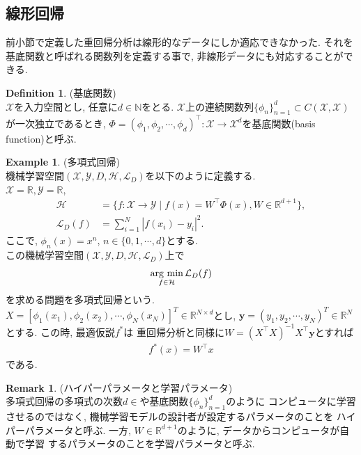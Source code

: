 \documentclass[11pt, a4paper, dvipdfmx]{jsarticle}
\theoremstyle{definition}
\newtheorem{Definition+}[Axiom+]{Definition}
\newtheorem{Example+}[Axiom+]{Example}
\newtheorem{Remark+}[Axiom+]{Remark}
\newcommand{\N}{\mathbb{N}}
\newcommand{\R}{\mathbb{R}}
\newcommand{\X}{\mathcal{X}}
\newcommand{\Y}{\mathcal{Y}}
\newcommand{\Hil}{\mathcal{H}}
\newcommand{\Loss}{\mathcal{L}_{D}}
\newcommand{\MLsp}{(\X, \Y, D, \Hil, \Loss)}
\newcommand{\argmin}{\mathop{\rm arg~min}\limits}
\begin{document}
\subsection{線形回帰}
前小節で定義した重回帰分析は線形的なデータにしか適応できなかった. それを
基底関数と呼ばれる関数列を定義する事で, 非線形データにも対応することができる.
\begin{Definition+}(基底関数)\\
    $\X$を入力空間とし, 任意に$d\in\N$をとる. $\X$上の連続関数列$\{\phi_{n}\}_{n = 1}^{d}\subset C(\X, \X)$
    が一次独立であるとき, $\Phi = (\phi_1, \phi_2, \cdots, \phi_d)^{\top}:\X\to\X^{d}$を基底関数(basis function)と呼ぶ.
\end{Definition+}
\begin{Example+}(多項式回帰)\\
    機械学習空間$\MLsp$を以下のように定義する.\\
    $\X = \R, \Y = \R$, 
    \begin{align*}
        \Hil &= \{f:\X\to\Y\mid f(x) = W^{\top}\Phi(x), W\in\R^{d + 1}\},\\
        \Loss(f) &= \sum_{i = 1}^{N}|f(x_i) - y_i|^2.
    \end{align*}
    ここで, $\phi_{n}(x) = x^{n}$, $n\in\{0, 1, \cdots, d\}$とする.\\
    この機械学習空間$\MLsp$上で
    \begin{align*}
        \argmin_{f\in\Hil}\Loss(f)
    \end{align*}
    を求める問題を多項式回帰という. $X = [\phi_{1}(x_1), \phi_{2}(x_{2}), \cdots, \phi_{N}(x_N)]^{T}\in\R^{N\times d}$とし, 
    $\mathbf{y} = (y_{1}, y_{2}, \cdots, y_{N})^{T}\in\R^{N}$とする. この時, 最適仮説$f^{*}$は
    重回帰分析と同様に$W = (X^\top X)^{-1}X^\top\mathbf{y}$とすれば
    \begin{align*}
        f^{*}(x) = W^{\top}x
    \end{align*}
    である. 
\end{Example+}
\begin{Remark+}(ハイパーパラメータと学習パラメータ)\\
    多項式回帰の多項式の次数$d\in$や基底関数$\{\phi_{n}\}_{n = 1}^{d}$のように
    コンピュータに学習させるのではなく, 機械学習モデルの設計者が設定するパラメータのことを
    ハイパーパラメータと呼ぶ. 一方, $W\in\R^{d + 1}$のように, データからコンピュータが自動で学習
    するパラメータのことを学習パラメータと呼ぶ.
\end{Remark+}
\end{document}

